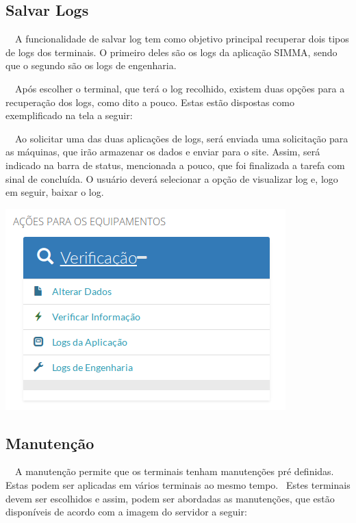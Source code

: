     \bigskip

    \subsection{Salvar Logs}
{\color{black}
    \ \ A funcionalidade de salvar log tem como objetivo principal recuperar dois tipos de logs dos terminais. O primeiro
        deles s\~ao os logs da aplica\c{c}\~ao SIMMA, sendo que o segundo s\~ao os logs de engenharia. }

{\color{black}
    \ \ Ap\'os escolher o terminal, que ter\'a o log recolhido, existem duas op\c{c}\~oes para a recupera\c{c}\~ao dos logs,
        como dito a pouco. Estas est\~ao dispostas como exemplificado na tela a seguir:}


        \bigskip

{\color{black}
    \ \ Ao solicitar uma das duas aplica\c{c}\~oes de logs, ser\'a enviada uma solicita\c{c}\~ao para as m\'aquinas, que
        ir\~ao armazenar os dados e enviar para o site. Assim, ser\'a indicado na barra de status, mencionada a pouco, que foi
        finalizada a tarefa com sinal de conclu\'ida. O usu\'ario dever\'a selecionar a op\c{c}\~ao de visualizar log e, logo
        em seguir, baixar o log. }

        \begin{center}
        \includegraphics[width=10.82cm,height=7.777cm]{figuras/RATCETECATMSTFLS051718v2-img008.png}
        \end{center}

        \bigskip

        \subsection{Manuten\c{c}\~ao}
{\color{black}
    \ \ A manuten\c{c}\~ao permite que os terminais tenham manuten\c{c}\~oes pr\'e definidas. Estas podem ser aplicadas em
        v\'arios terminais ao mesmo tempo. \ Estes terminais devem ser escolhidos e assim, podem ser abordadas as
        manuten\c{c}\~oes, que est\~ao dispon\'iveis de acordo com a imagem do servidor a seguir:}


